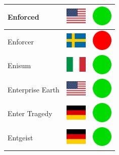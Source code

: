 \documentclass[12pt, a4paper, twoside]{report}
\begin{document}
\begin{center}
\begin{longtable}{|p{5cm}|p{2cm}|p{2cm}|}
 Enforced                                                   & \includegraphics[width=1cm]{../img/flags/us} &   \includegraphics[width=1cm]{../likes/y} \\ \hline
 Enforcer                                                   & \includegraphics[width=1cm]{../img/flags/se} &   \includegraphics[width=1cm]{../likes/n} \\ \hline
 Enisum                                                     & \includegraphics[width=1cm]{../img/flags/it} &   \includegraphics[width=1cm]{../likes/y} \\ \hline
 Enterprise Earth                                           & \includegraphics[width=1cm]{../img/flags/us} &   \includegraphics[width=1cm]{../likes/y} \\ \hline
 Enter Tragedy                                              & \includegraphics[width=1cm]{../img/flags/de} &   \includegraphics[width=1cm]{../likes/y} \\ \hline
 Entgeist                                                   & \includegraphics[width=1cm]{../img/flags/de} &   \includegraphics[width=1cm]{../likes/y} \\ \hline

\end{longtable}
\end{center}
\end{document}
